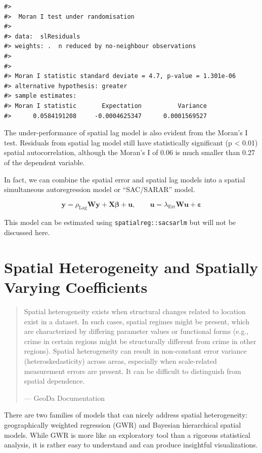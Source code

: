 \documentclass[
  11pt,
]{book}
\begin{document}
\begin{verbatim}
#> 
#>  Moran I test under randomisation
#> 
#> data:  slResiduals  
#> weights: .  n reduced by no-neighbour observations
#>   
#> 
#> Moran I statistic standard deviate = 4.7, p-value = 1.301e-06
#> alternative hypothesis: greater
#> sample estimates:
#> Moran I statistic       Expectation          Variance 
#>      0.0584191208     -0.0004625347      0.0001569527
\end{verbatim}

The under-performance of spatial lag model is also evident from the Moran's I test. Residuals from spatial lag model still have statistically significant (p \textless{} 0.01) spatial autocorrelation, although the Moran's I of 0.06 is much smaller than 0.27 of the dependent variable.

In fact, we can combine the spatial error and spatial lag models into a spatial simultaneous autoregression model or ``SAC/SARAR'' model.

\[
{\mathbf y} = \rho_{\mathrm{Lag}} {\mathbf W}{\mathbf y} + {\mathbf X}{\mathbf \beta} + {\mathbf u}, 
\qquad {\mathbf u} = \lambda_{\mathrm{Err}} {\mathbf W} {\mathbf u} + {\mathbf \varepsilon}
\]

This model can be estimated using \texttt{spatialreg::sacsarlm} but will not be discussed here.

\hypertarget{spatial-heterogeneity-and-spatially-varying-coefficients}{%
\section{Spatial Heterogeneity and Spatially Varying Coefficients}\label{spatial-heterogeneity-and-spatially-varying-coefficients}}

\begin{quote}
Spatial heterogeneity exists when structural changes related to location exist in a dataset. In such cases, spatial regimes might be present, which are characterized by differing parameter values or functional forms (e.g., crime in certain regions might be structurally different from crime in other regions). Spatial heterogeneity can result in non-constant error variance (heteroskedasticity) across areas, especially when scale-related measurement errors are present. It can be difficult to distinguish from spatial dependence.

--- GeoDa Documentation
\end{quote}

There are two families of models that can nicely address spatial heterogeneity: geographically weighted regression (GWR) and Bayesian hierarchical spatial models. While GWR is more like an exploratory tool than a rigorous statistical analysis, it is rather easy to understand and can produce insightful visualizations.
\end{document}
